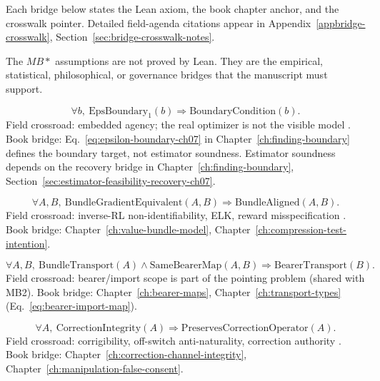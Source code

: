 Each bridge below states the Lean axiom, the book chapter anchor, and the crosswalk pointer.
Detailed field-agenda citations appear in Appendix~\ref{appbridge-crosswalk}, Section~\ref{sec:bridge-crosswalk-notes}.


The \(MB*\) assumptions are not proved by Lean.
They are the empirical, statistical, philosophical, or governance bridges that the manuscript must support.

\begin{assumption}
\label{appi:ass:mb1}
\begin{equation}
\label{appi:eq:mb1}
\forall b,\ \mathrm{EpsBoundary}_{1}(b)\Rightarrow \mathrm{BoundaryCondition}(b).
\end{equation}
Field crossroad: embedded agency; the real optimizer is not the visible model \autocite{demski2019embedded}.
Book bridge: Eq.~\eqref{eq:epsilon-boundary-ch07} in Chapter~\ref{ch:finding-boundary} defines the boundary target, not estimator soundness.
Estimator soundness depends on the recovery bridge in Chapter~\ref{ch:finding-boundary}, Section~\ref{sec:estimator-feasibility-recovery-ch07}.
\end{assumption}

\begin{assumption}
\label{appi:ass:mb2}
\begin{equation}
\label{appi:eq:mb2}
\forall A,B,\ \mathrm{BundleGradientEquivalent}(A,B)\Rightarrow \mathrm{BundleAligned}(A,B).
\end{equation}
Field crossroad: inverse-RL non-identifiability, ELK, reward misspecification \autocite{ng2000irl,christiano2021elk,casper2023rlhflimits}.
Book bridge: Chapter~\ref{ch:value-bundle-model}, Chapter~\ref{ch:compression-test-intention}.
\end{assumption}

\begin{assumption}
\label{appi:ass:mb3}
\begin{equation}
\label{appi:eq:mb3}
\forall A,B,\ \mathrm{BundleTransport}(A)\wedge \mathrm{SameBearerMap}(A,B)\Rightarrow \mathrm{BearerTransport}(B).
\end{equation}
Field crossroad: bearer/import scope is part of the pointing problem (shared with MB2).
Book bridge: Chapter~\ref{ch:bearer-maps}, Chapter~\ref{ch:transport-types} (Eq.~\eqref{eq:bearer-import-map}).
\end{assumption}

\begin{assumption}
\label{appi:ass:mb4}
\begin{equation}
\label{appi:eq:mb4}
\forall A,\ \mathrm{CorrectionIntegrity}(A)\Rightarrow \mathrm{PreservesCorrectionOperator}(A).
\end{equation}
Field crossroad: corrigibility, off-switch anti-naturality, correction authority \autocite{soares2015corrigibility,orseau2016interruptible}.
Book bridge: Chapter~\ref{ch:correction-channel-integrity}, Chapter~\ref{ch:manipulation-false-consent}.
\end{assumption}

